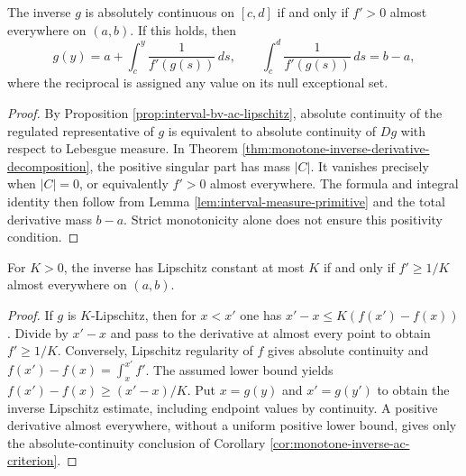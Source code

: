 \begin{corollary}\label{cor:monotone-inverse-ac-criterion}
The inverse $g$ is absolutely continuous on $[c,d]$ if and only if $f'>0$ almost everywhere on $(a,b)$. If this holds, then
\[
 g(y)=a+\int_c^y\frac1{f'(g(s))}\,ds,
 \qquad \int_c^d\frac1{f'(g(s))}\,ds=b-a,
\]
where the reciprocal is assigned any value on its null exceptional set.
\end{corollary}
\begin{proof}
By Proposition \ref{prop:interval-bv-ac-lipschitz}, absolute continuity of the regulated representative of $g$ is equivalent to absolute continuity of $Dg$ with respect to Lebesgue measure. In Theorem \ref{thm:monotone-inverse-derivative-decomposition}, the positive singular part has mass $|C|$. It vanishes precisely when $|C|=0$, or equivalently $f'>0$ almost everywhere. The formula and integral identity then follow from Lemma \ref{lem:interval-measure-primitive} and the total derivative mass $b-a$. Strict monotonicity alone does not ensure this positivity condition.
\end{proof}

\begin{corollary}\label{cor:monotone-inverse-lipschitz-criterion}
For $K>0$, the inverse has Lipschitz constant at most $K$ if and only if $f'\geq1/K$ almost everywhere on $(a,b)$.
\end{corollary}
\begin{proof}
If $g$ is $K$-Lipschitz, then for $x<x'$ one has $x'-x\leq K(f(x')-f(x))$. Divide by $x'-x$ and pass to the derivative at almost every point to obtain $f'\geq1/K$. Conversely, Lipschitz regularity of $f$ gives absolute continuity and $f(x')-f(x)=\int_x^{x'}f'$. The assumed lower bound yields $f(x')-f(x)\geq(x'-x)/K$. Put $x=g(y)$ and $x'=g(y')$ to obtain the inverse Lipschitz estimate, including endpoint values by continuity. A positive derivative almost everywhere, without a uniform positive lower bound, gives only the absolute-continuity conclusion of Corollary \ref{cor:monotone-inverse-ac-criterion}.
\end{proof}

